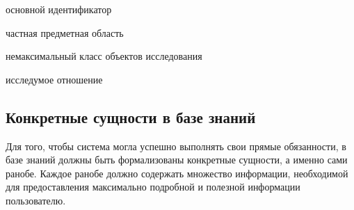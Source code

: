 \begin{SCn}
    \begin{scnrelfromlist}{основной идентификатор}
        \begin{scnindent}
        \end{scnindent}
        \begin{scnindent}
        \end{scnindent}
    \end{scnrelfromlist}

    \begin{scnrelfromlist}{частная предметная область}
    \end{scnrelfromlist}
    \begin{scnhaselementrolelist}{немаксимальный класс объектов исследования}
    \end{scnhaselementrolelist}

    \begin{scnhaselementrolelist}{исследумое отношение}
    \end{scnhaselementrolelist}

\end{SCn}

\subsection{Конкретные сущности в базе знаний}

Для того, чтобы система могла успешно выполнять свои прямые обязанности, в базе знаний должны быть формализованы конкретные сущности, а именно сами ранобе. Каждое ранобе должно содержать множество информации, необходимой для предоставления максимально подробной и полезной информации пользователю.

